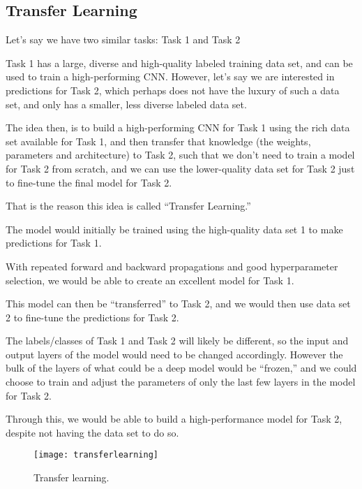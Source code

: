 	\subsection{Transfer Learning}
	\begin{bulletedlist}
		\item Let's say we have two similar tasks: Task 1 and Task 2
		\item Task 1 has a large, diverse and high-quality labeled training data set, and can be used to train a high-performing CNN. However, let's say we are interested in predictions for Task 2, which perhaps does not have the luxury of such a data set, and only
has a smaller, less diverse labeled data set.
		\item The idea then, is to build a high-performing CNN for Task 1 using the rich data set available for Task 1, and then
transfer that knowledge (the weights, parameters and architecture) to Task 2, such that we don't need to train a model for Task 2 from scratch, and we can use the lower-quality data set for Task 2 just to fine-tune the final model for Task 2.
		\item That is the reason this idea is called ``Transfer Learning.''
		\item The model would initially be trained using the high-quality data set 1 to make predictions for Task 1.
		\item With repeated forward and backward propagations and good hyperparameter selection, we would be able to create an excellent model for Task 1.
		\item This model can then be ``transferred'' to Task 2, and we would then use data set 2 to fine-tune the predictions for Task 2.
		\item The labels/classes of Task 1 and Task 2 will likely be different, so the input and output layers of the model would need to be changed accordingly.  However the bulk of the layers of what could be a deep model would be ``frozen,'' and we could choose to train and adjust the parameters of only the last few layers in the model for Task 2.
		\item Through this, we would be able to build a high-performance model for Task 2, despite not having the data set to do so.
	\end{bulletedlist}

	\begin{figure}[tbh]
		\centering
		\texttt{[image: transferlearning]}
		\caption[Transfer learning]{Transfer learning.}
		\label{fig:transferlearning}
	\end{figure}

